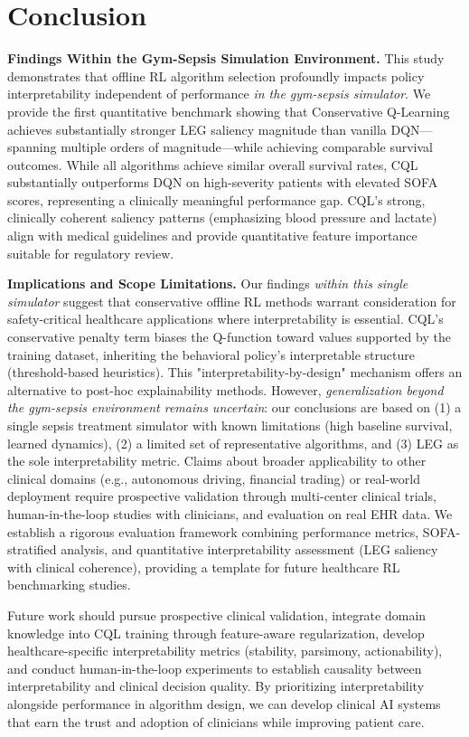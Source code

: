 
\section{Conclusion}\label{sec:conclusion}

\textbf{Findings Within the Gym-Sepsis Simulation Environment.} This study demonstrates that offline RL algorithm selection profoundly impacts policy interpretability independent of performance \textit{in the gym-sepsis simulator}. We provide the first quantitative benchmark showing that Conservative Q-Learning achieves substantially stronger LEG saliency magnitude than vanilla DQN—spanning multiple orders of magnitude—while achieving comparable survival outcomes. While all algorithms achieve similar overall survival rates, CQL substantially outperforms DQN on high-severity patients with elevated SOFA scores, representing a clinically meaningful performance gap. CQL's strong, clinically coherent saliency patterns (emphasizing blood pressure and lactate) align with medical guidelines and provide quantitative feature importance suitable for regulatory review.

\textbf{Implications and Scope Limitations.} Our findings \textit{within this single simulator} suggest that conservative offline RL methods warrant consideration for safety-critical healthcare applications where interpretability is essential. CQL's conservative penalty term biases the Q-function toward values supported by the training dataset, inheriting the behavioral policy's interpretable structure (threshold-based heuristics). This "interpretability-by-design" mechanism offers an alternative to post-hoc explainability methods. However, \textit{generalization beyond the gym-sepsis environment remains uncertain}: our conclusions are based on (1) a single sepsis treatment simulator with known limitations (high baseline survival, learned dynamics), (2) a limited set of representative algorithms, and (3) LEG as the sole interpretability metric. Claims about broader applicability to other clinical domains (e.g., autonomous driving, financial trading) or real-world deployment require prospective validation through multi-center clinical trials, human-in-the-loop studies with clinicians, and evaluation on real EHR data. We establish a rigorous evaluation framework combining performance metrics, SOFA-stratified analysis, and quantitative interpretability assessment (LEG saliency with clinical coherence), providing a template for future healthcare RL benchmarking studies.

Future work should pursue prospective clinical validation, integrate domain knowledge into CQL training through feature-aware regularization, develop healthcare-specific interpretability metrics (stability, parsimony, actionability), and conduct human-in-the-loop experiments to establish causality between interpretability and clinical decision quality. By prioritizing interpretability alongside performance in algorithm design, we can develop clinical AI systems that earn the trust and adoption of clinicians while improving patient care.

